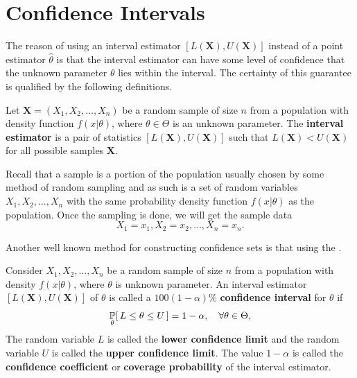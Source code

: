 \chapter{Confidence Intervals}

The reason of using an interval estimator $[L(\mathbf{X}), U(\mathbf{X})]$ 
instead of a point estimator $\widehat{\theta}$ is that the interval estimator 
can have some level of confidence that the unknown parameter $\theta$ lies within the interval. 
The certainty of this guarantee is qualified by the following definitions.

\begin{definition}
    Let $\mathbf{X} = (X_1, X_2, \ldots, X_n)$ be a random sample of size $n$ from a population with
    density function $f(x | \theta)$, where $\theta \in \Theta$ is an unknown parameter. The 
    \textbf{interval estimator} is a pair of statistics $[L(\mathbf{X}), U(\mathbf{X})]$ such that $L(\mathbf{X}) < U(\mathbf{X})$ for all possible samples $\mathbf{X}$.
\end{definition}

Recall that a sample is a portion of the population usually chosen by some method of random sampling and 
as such is a set of random variables $X_1, X_2, \ldots, X_n$ with the same probability density function 
$f(x | \theta)$ as the population. Once the sampling is done, we will get the sample data 
\[
    X_1 = x_1, X_2 = x_2, \ldots, X_n = x_n.
\]

Another well known method for constructing confidence 
sets is that using the .

\begin{definition}
    Consider $X_1, X_2, \ldots, X_n$ be a random sample of size $n$ from a population with density $f(x|\theta)$, where 
    $\theta$ is unknown parameter. An interval estimator $[L(\mathbf{X}), U(\mathbf{X})]$ of $\theta$ is called a 
    $100(1-\alpha) \%$ \textbf{confidence interval} for $\theta$ if
    \begin{equation}
        \uprob[\theta]{ L \leq \theta \leq U } = 1 - \alpha, \quad \forall \theta \in \Theta,
    \end{equation}
    The random variable $L$ is called the \textbf{lower confidence limit} and the random variable $U$ is called the
    \textbf{upper confidence limit}. The value $1 - \alpha$ is called the \textbf{confidence coefficient} or \textbf{coverage probability} of the interval estimator.
\end{definition}

